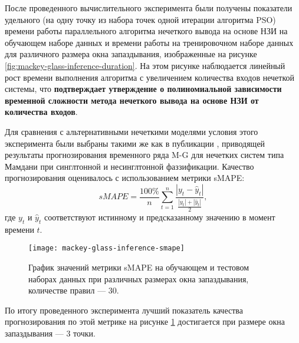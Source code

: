 После проведенного вычислительного эксперимента были получены показатели удельного (на одну точку из набора точек одной итерации алгоритма PSO) времени работы параллельного алгоритма нечеткого вывода на основе НЗИ на обучающем наборе данных и времени работы на тренировочном наборе данных для различного размера окна запаздывания, изображенные на рисунке \cref{fig:mackey-glass-inference-duration}. На этом рисунке наблюдается линейный рост времени выполнения алгоритма с увеличением количества входов нечеткой системы, что \textbf{подтверждает утверждение о полиномиальной зависимости временной сложности метода нечеткого вывода на основе НЗИ от количества входов}.

Для сравнения с альтернативными нечеткими моделями условия этого эксперимента были выбраны такими же как в публикации \cite{}, приводящей результаты прогнозирования временного ряда M-G для нечетких систем типа Мамдани при синглтонной и несинглтонной фаззификации. Качество прогнозирования оценивалось с использованием метрики sMAPE:
\[
sMAPE = \frac{100\%}{n} \sum_{t=1}^n 
\frac{|y_t - \hat{y}_t|}{\tfrac{|y_t| + |\hat{y}_t|}{2}},
\]
где $y_t$ и $\hat{y}_t$ соответствуют истинному и предсказанному значению в момент времени $t$.

\begin{figure}
	\centering
	\texttt{[image: mackey-glass-inference-smape]}
	\caption{График значений метрики sMAPE на обучающем и тестовом наборах данных при различных размерах окна запаздывания, количестве правил --- 30.}
	\label{fig:mackey-glass-inference-smape}
\end{figure}

По итогу проведенного эксперимента лучший показатель качества прогнозирования по этой метрике на рисунке \cref{fig:mackey-glass-inference-smape} достигается при размере окна запаздывания --- 3 точки. 

